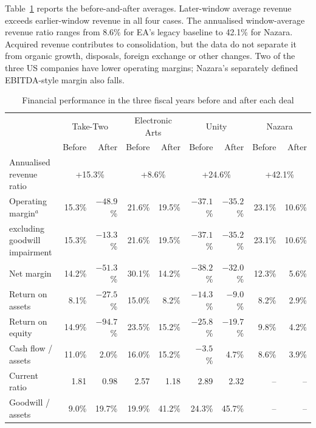 \documentclass[11pt]{article}
\newcommand{\botrule}{\bottomrule}
\begin{document}
Table~\ref{tab:results} reports the before-and-after averages. Later-window average revenue exceeds earlier-window revenue in all four cases. The annualised window-average revenue ratio ranges from 8.6\% for EA's legacy baseline to 42.1\% for Nazara. Acquired revenue contributes to consolidation, but the data do not separate it from organic growth, disposals, foreign exchange or other changes. Two of the three US companies have lower operating margins; Nazara's separately defined EBITDA-style margin also falls.

\begin{table}[t]
\caption{Financial performance in the three fiscal years before and after each deal}\label{tab:results}
\scriptsize
\setlength{\tabcolsep}{3pt}
\begin{tabular}{@{}lrrrrrrrr@{}}
\toprule
 & \multicolumn{2}{c}{Take-Two} & \multicolumn{2}{c}{Electronic Arts} & \multicolumn{2}{c}{Unity} & \multicolumn{2}{c}{Nazara} \\
 & Before & After & Before & After & Before & After & Before & After \\
\midrule
Annualised revenue ratio & \multicolumn{2}{c}{+15.3\%} & \multicolumn{2}{c}{+8.6\%} & \multicolumn{2}{c}{+24.6\%} & \multicolumn{2}{c}{+42.1\%} \\
Operating margin$^{a}$ & 15.3\% & $-48.9$\% & 21.6\% & 19.5\% & $-37.1$\% & $-35.2$\% & 23.1\% & 10.6\% \\
\quad excluding goodwill impairment & 15.3\% & $-13.3$\% & 21.6\% & 19.5\% & $-37.1$\% & $-35.2$\% & 23.1\% & 10.6\% \\
Net margin & 14.2\% & $-51.3$\% & 30.1\% & 14.2\% & $-38.2$\% & $-32.0$\% & 12.3\% & 5.6\% \\
Return on assets & 8.1\% & $-27.5$\% & 15.0\% & 8.2\% & $-14.3$\% & $-9.0$\% & 8.2\% & 2.9\% \\
Return on equity & 14.9\% & $-94.7$\% & 23.5\% & 15.2\% & $-25.8$\% & $-19.7$\% & 9.8\% & 4.2\% \\
Cash flow / assets & 11.0\% & 2.0\% & 16.0\% & 15.2\% & $-3.5$\% & 4.7\% & 8.6\% & 3.9\% \\
Current ratio & 1.81 & 0.98 & 2.57 & 1.18 & 2.89 & 2.32 & -- & -- \\
Goodwill / assets & 9.0\% & 19.7\% & 19.9\% & 41.2\% & 24.3\% & 45.7\% & -- & -- \\
\botrule
\end{tabular}
\par{}
\end{table}
\end{document}
